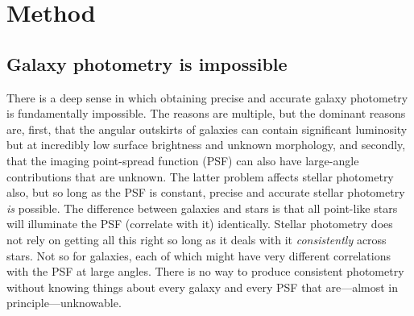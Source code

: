 \documentclass[12pt,preprint,pdftex]{aastex}
\begin{document}
\section{Method}
\subsection{Galaxy photometry is impossible}\label{sec:philosophy}

There is a deep sense in which obtaining precise and accurate galaxy
photometry is fundamentally impossible.  The reasons are multiple, but
the dominant reasons are, first, that the angular outskirts of
galaxies can contain significant luminosity but at incredibly low
surface brightness and unknown morphology, and secondly, that the
imaging point-spread function (PSF) can also have large-angle
contributions that are unknown.  The latter problem affects stellar
photometry also, but so long as the PSF is constant, precise and
accurate stellar photometry \emph{is} possible.  The difference
between galaxies and stars is that all point-like stars will
illuminate the PSF (correlate with it) identically.  Stellar
photometry does not rely on getting all this right so long as it deals
with it \emph{consistently} across stars.  Not so for galaxies, each
of which might have very different correlations with the PSF at large
angles.  There is no way to produce consistent photometry without
knowing things about every galaxy and every PSF that are---almost in
principle---unknowable.
\end{document}
